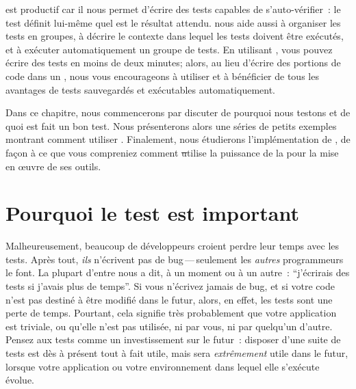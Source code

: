 \documentclass[a4paper,10pt,twoside]{book}
\begin{document}
\sunit est productif car il nous permet d'écrire des tests capables de s'auto-vérifier~: le test définit lui-même quel est le résultat attendu. \sunit nous aide aussi à organiser les tests en groupes, à décrire le contexte dans lequel les tests doivent être exécutés, et à exécuter automatiquement un groupe de tests. En utilisant \sunit, vous pouvez écrire des tests en moins de deux minutes; alors, au lieu d'écrire des portions de code dans un , nous vous encourageons à utiliser \sunit et à bénéficier de tous les avantages de tests sauvegardés et exécutables automatiquement.

Dans ce chapitre, nous commencerons par discuter de pourquoi nous testons et de quoi est fait un bon test. Nous présenterons alors une séries de petits exemples montrant comment utiliser \sunit. Finalement, nous étudierons l'implémentation de \sunit, de façon à ce que vous compreniez comment \st utilise la puissance de la  pour la mise en \oe uvre de ses outils.


\section{Pourquoi le test est important}
\label{sec:why}

Malheureusement, beaucoup de développeurs croient perdre leur temps avec les tests. 
Après tout, \emph{ils} n'écrivent pas de bug\,---\,seulement les \emph{autres} programmeurs le font. La plupart d'entre nous a dit, à un moment ou à un autre~: ``j'écrirais des tests si j'avais plus de temps''.
Si vous n'écrivez jamais de bug, et si votre code n'est pas destiné à être modifié dans le futur, alors, en effet, les tests sont une perte de temps. Pourtant, cela signifie très probablement que votre application est triviale, ou qu'elle n'est pas utilisée, ni par vous, ni par quelqu'un d'autre. Pensez aux tests comme un investissement sur le futur~: disposer d'une suite de tests est dès à présent tout à fait utile, mais sera \emph{extrêmement} utile dans le futur, lorsque votre application ou votre environnement dans lequel elle s'exécute évolue. 
\end{document}
